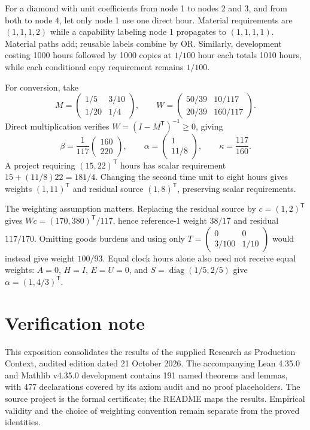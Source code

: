 \documentclass[11pt,a4paper]{article}
\begin{document}
For a diamond with unit coefficients from node 1 to nodes 2 and 3, and from both to node 4, let only node 1 use one direct hour. Material requirements are $(1,1,1,2)$ while a capability labeling node 1 propagates to $(1,1,1,1)$. Material paths add; reusable labels combine by OR. Similarly, development costing 1000 hours followed by 1000 copies at $1/100$ hour each totals 1010 hours, while each conditional copy requirement remains $1/100$.

For conversion, take
\begin{equation}
M=\begin{pmatrix}1/5&3/10\\1/20&1/4\end{pmatrix},\qquad
W=\begin{pmatrix}50/39&10/117\\20/39&160/117\end{pmatrix}.
\end{equation}
Direct multiplication verifies $W=(I-M^{\mathsf T})^{-1}\geq0$, giving
\begin{equation}
\beta=\frac1{117}\begin{pmatrix}160\\220\end{pmatrix},\qquad
\alpha=\begin{pmatrix}1\\11/8\end{pmatrix},\qquad\kappa=\frac{117}{160}.
\end{equation}
A project requiring $(15,22)^{\mathsf T}$ hours has scalar requirement $15+(11/8)22=181/4$. Changing the second time unit to eight hours gives weights $(1,11)^{\mathsf T}$ and residual source $(1,8)^{\mathsf T}$, preserving scalar requirements.

The weighting assumption matters. Replacing the residual source by $c=(1,2)^{\mathsf T}$ gives $Wc=(170,380)^{\mathsf T}/117$, hence reference-1 weight $38/17$ and residual $117/170$. Omitting goods burdens and using only $T=\left(\begin{smallmatrix}0&0\\3/100&1/10\end{smallmatrix}\right)$ would instead give weight $100/93$. Equal clock hours alone also need not receive equal weights: $A=0$, $H=I$, $E=U=0$, and $S=\operatorname{diag}(1/5,2/5)$ give $\alpha=(1,4/3)^{\mathsf T}$.

\section{Verification note}
This exposition consolidates the results of the supplied Research as Production Context, audited edition dated 21 October 2026. The accompanying Lean 4.35.0 and Mathlib v4.35.0 development contains 191 named theorems and lemmas, with 477 declarations covered by its axiom audit and no proof placeholders. The source project is the formal certificate; the README maps the results. Empirical validity and the choice of weighting convention remain separate from the proved identities.
\end{document}
